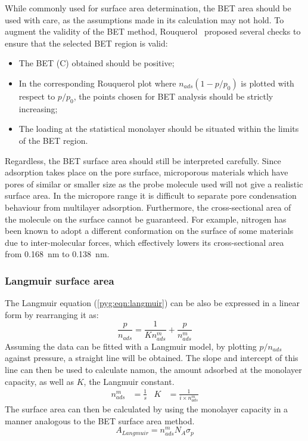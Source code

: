While commonly used for surface area determination, the \gls{BET} area
should be used with care, as the assumptions made in
its calculation may not hold. To augment the validity of the \gls{BET}
method, Rouquerol~\cite{rouquerolAdsorptionPowdersPorous2013} proposed
several checks to ensure that the selected \gls{BET} region is valid:

\begin{itemize}

	\item The \gls{BET} (\gls{C}) obtained should be positive;
	\item In the corresponding Rouquerol plot where \(n_{ads}(1-p/p_0)\)
	      is plotted with respect to \(p/p_0\), the points chosen for \gls{BET}
	      analysis should be strictly increasing;
	\item The loading at the statistical monolayer should be
	      situated within the limits of the \gls{BET} region.

\end{itemize}

Regardless, the \gls{BET} surface area should still be interpreted carefully.
Since adsorption takes place on the pore surface, microporous materials
which have pores of similar or smaller size as the probe molecule used
will not give a realistic surface area. In the micropore range
it is difficult to separate pore condensation behaviour from
multilayer adsorption. Furthermore, the cross-sectional
area of the molecule on the surface cannot be guaranteed. For example,
nitrogen has been known to adopt a different conformation on the surface
of some materials due to inter-molecular forces, which effectively
lowers its cross-sectional area~\cite{rouquerolAdsorptionPowdersPorous2013}
from \SI{0.168}{\nano\metre} to \SI{0.138}{\nano\metre}.

\subsubsection{Langmuir surface area}\label{pyg:charac:langmuirarea}

The Langmuir equation (\autoref{pyg:eqn:langmuir}) can be also
be expressed in a linear form by rearranging it as:
%
\begin{equation}
	\frac{p}{n_{ads}} = \frac{1}{K n_{ads}^m} + \frac{p}{n_{ads}^m}
\end{equation}
%
Assuming the data can be fitted with a Langmuir model, by plotting
\({p}/{n_{ads}}\) against pressure, a straight line will be obtained.
The slope and intercept of this line can then be used to calculate
\gls{namon}, the amount adsorbed at the monolayer capacity, as well
as \(K\), the Langmuir constant.
%
\begin{align}
	n_{ads}^m & = \frac{1}{s} & K & = \frac{1}{i \times n_{ads}^m}
\end{align}
%
The surface area can then be calculated by using the monolayer
capacity in a manner analogous to the \gls{BET} surface area method.
%
\begin{equation}
	A_{Langmuir} = n_{ads}^m N_A \sigma_p
\end{equation}

